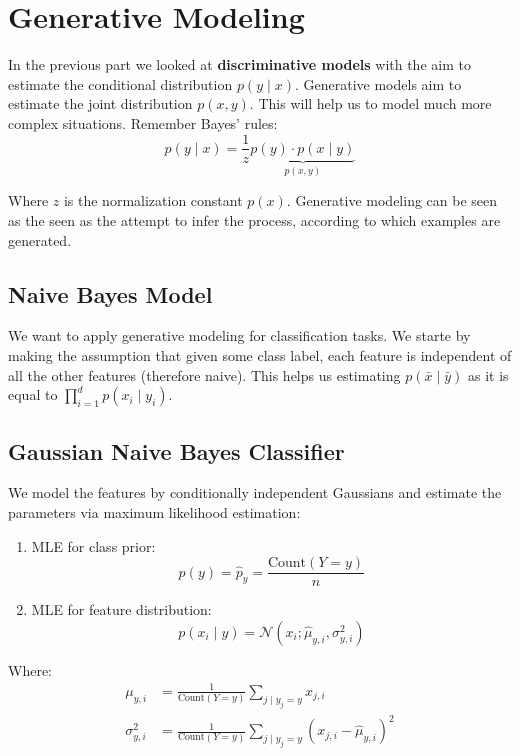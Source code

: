 \section{Generative Modeling}

In the previous part we looked at \textbf{discriminative models} with the aim to estimate the conditional distribution $p(y \; | \; x)$. Generative models aim to estimate the joint distribution $p(x, y)$. This will help us to model much more complex situations. Remember Bayes' rules:
$$p(y \; | \; x) = \frac{1}{z} \underbrace{p(y) \cdot p(x \; | \; y)}_{p(x,y)}$$

Where $z$ is the normalization constant $p(x)$. Generative modeling can be seen as the seen as the attempt to infer the process, according to which examples are generated.

\subsection{Naive Bayes Model}

We want to apply generative modeling for classification tasks. We starte by making the assumption that given some class label, each feature is independent of all the other features (therefore naive). This helps us estimating $p(\bar x \; | \; \bar y)$ as it is equal to $\prod_{i=1}^d p(x_i \; | \; y_i)$. \medskip

\subsection{Gaussian Naive Bayes Classifier}

We model the features by conditionally independent Gaussians and estimate the parameters via maximum likelihood estimation:
\begin{enumerate}
	\item MLE for class prior:
		$$p(y) = \hat p_y = \frac{\text{Count}(Y = y)}{n}$$
	\item MLE for feature distribution:
		$$p(x_i \; | \; y) = \mathcal{N}(x_i; \hat \mu_{y,i}, \sigma^2_{y,i})$$
\end{enumerate}

Where:
\begin{align*}
	\mu_{y,i} &= \frac{1}{\text{Count}(Y = y)} \sum_{j \; | \; y_j = y} x_{j,i}\\
	\sigma^2_{y,i} &= \frac{1}{\text{Count}(Y = y)} \sum_{j \; | \; y_j = y} (x_{j,i} - \hat \mu_{y, i})^2
\end{align*}


